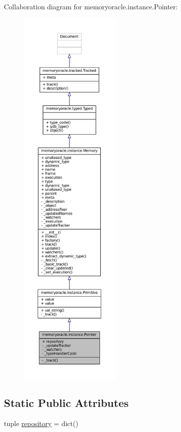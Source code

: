 Collaboration diagram for memoryoracle.\+instance.\+Pointer\+:
\nopagebreak
\begin{figure}[H]
\begin{center}
\leavevmode
\includegraphics[height=550pt]{classmemoryoracle_1_1instance_1_1Pointer__coll__graph}
\end{center}
\end{figure}
\subsection*{Static Public Attributes}
\begin{DoxyCompactItemize}
\item 
tuple \hyperlink{classmemoryoracle_1_1instance_1_1Pointer_ab386b41b9f0cf6ff19065f0ae00647b6}{repository} = dict()
\end{DoxyCompactItemize}
